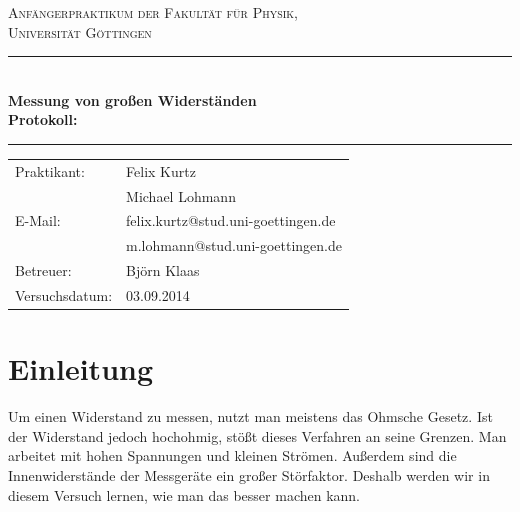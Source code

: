 \documentclass[12pt,a4paper,titlepage,headinclude,bibtotoc]{scrartcl}
\begin{document}
\begin{titlepage}
\centering
\textsc{\Large Anfängerpraktikum der Fakultät für
  Physik,\\[1.5ex] Universität Göttingen}

\vspace*{4.2cm}

\rule{\textwidth}{1pt}\\[0.5cm]
{\huge \bfseries
  Messung von großen Widerständen\\[1.5ex]
  Protokoll:}\\[0.5cm]
\rule{\textwidth}{1pt}

\vspace*{3.0cm}

\begin{Large}
\begin{tabular}{ll}
Praktikant:
 	&  Felix Kurtz\\
 	&  Michael Lohmann\\

E-Mail: 
	&  felix.kurtz@stud.uni-goettingen.de\\
	& m.lohmann@stud.uni-goettingen.de\\

 Betreuer: & Björn Klaas\\
 Versuchsdatum: &  03.09.2014\\
\end{tabular}
\end{Large}

\vspace*{0.8cm}

\begin{Large}
\end{Large}

\end{titlepage}

\tableofcontents

\newpage

\section{Einleitung}
\label{sec:einleitung}
Um einen Widerstand zu messen, nutzt man meistens das Ohmsche Gesetz.
Ist der Widerstand jedoch hochohmig, stößt dieses Verfahren an seine Grenzen.
Man arbeitet mit hohen Spannungen und kleinen Strömen.
Außerdem sind die Innenwiderstände der Messgeräte ein großer Störfaktor.
Deshalb werden wir in diesem Versuch lernen, wie man das besser machen kann. 
\end{document}
